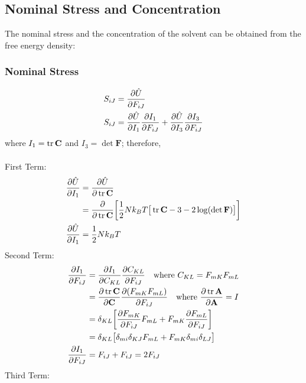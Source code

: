 \documentclass[12pt,3p]{article}
\numberwithin{equation}{section}
\begin{document}
\subsection{Nominal Stress and Concentration}
The nominal stress and the concentration of the solvent can be obtained from the free energy density: 
\subsubsection{Nominal Stress}
\begin{align*}
S_{iJ} &= \pdv{\hat{U}}{F_{iJ}} \\
S_{iJ} &= \pdv{\hat{U}}{I_1} \pdv{I_1}{F_{iJ}} + \pdv{\hat{U}}{I_3} \pdv{I_3}{F_{iJ}} 
\end{align*}
where $I_1 = \tr \mathbf{C}$ and $I_3 = \det \mathbf{F}$; therefore, \\ \\ 
First Term:
\begin{align*}
\pdv{\hat{U}}{I_1} &= \pdv{\hat{U}}{\tr \mathbf{C}} \\
			   &= \pdv{}{\tr \mathbf{C}} \bigg[ \frac{1}{2} N k_B T \big[ \tr \mathbf{C}- 3 - 2 \log (\det \mathbf{F}) \big] \bigg]  \\
\pdv{\hat{U}}{I_1} &= \frac{1}{2} N k_B T 
\end{align*}
Second Term:
\begin{align*}
\pdv{I_1}{F_{iJ}} &= \pdv{I_1}{C_{KL}} \pdv{C_{KL}}{F_{iJ}} \quad \text{where } C_{KL} = F_{mK} F_{mL} \\
			&= \pdv{\tr \mathbf{C}}{\mathbf{C}} \pdv{(F_{mK} F_{mL})}{F_{iJ}} \quad \text{where } \pdv{\tr \mathbf{A}}{\mathbf{A}} = I \\
			&= \delta_{KL} \bigg[ \pdv{F_{mK}}{F_{iJ}} F_{mL} + F_{mK} \pdv{F_{mL}}{F_{iJ}} \bigg] \\
			&= \delta_{KL} \big[ \delta_{mi} \delta_{KJ} F_{mL} + F_{mK} \delta_{mi} \delta_{LJ} \big] \\
\pdv{I_1}{F_{iJ}} &= F_{iJ} + F_{iJ} = 2 F_{iJ}
\end{align*}
Third Term:
\end{document}
